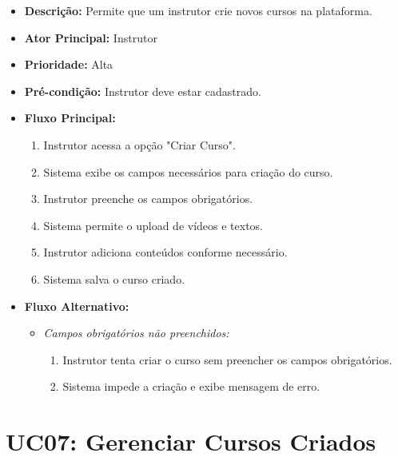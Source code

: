         \begin{itemize}
            \item \textbf{Descrição:} Permite que um instrutor crie novos cursos na plataforma.
            
            \item \textbf{Ator Principal:} Instrutor
            
            \item \textbf{Prioridade:} Alta
            
            \item \textbf{Pré-condição:} Instrutor deve estar cadastrado.
            
            \item \textbf{Fluxo Principal:}
            \begin{enumerate}
                \item Instrutor acessa a opção "Criar Curso".
                \item Sistema exibe os campos necessários para criação do curso.
                \item Instrutor preenche os campos obrigatórios.
                \item Sistema permite o upload de vídeos e textos.
                \item Instrutor adiciona conteúdos conforme necessário.
                \item Sistema salva o curso criado.
            \end{enumerate}

            \item \textbf{Fluxo Alternativo:}
            \begin{itemize}
                \item \textit{Campos obrigatórios não preenchidos:}
                \begin{enumerate}
                    \item Instrutor tenta criar o curso sem preencher os campos obrigatórios.
                    \item Sistema impede a criação e exibe mensagem de erro.
                \end{enumerate}
            \end{itemize}
        \end{itemize}

        \section*{UC07: Gerenciar Cursos Criados}

